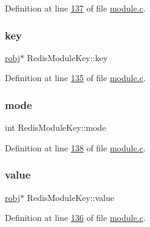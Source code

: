 Definition at line \hyperlink{module_8c_source_l00137}{137} of file \hyperlink{module_8c_source}{module.\+c}.

\mbox{\label{structRedisModuleKey_acf043c49b8fc45b97cb5e66aaddefba7}} 
\subsubsection{\texorpdfstring{key}{key}}
{\footnotesize\ttfamily \hyperlink{structredisObject}{robj}$\ast$ Redis\+Module\+Key\+::key}



Definition at line \hyperlink{module_8c_source_l00135}{135} of file \hyperlink{module_8c_source}{module.\+c}.

\mbox{\label{structRedisModuleKey_a085345181b4c4bf7ad3864bc2abd13bd}} 
\subsubsection{\texorpdfstring{mode}{mode}}
{\footnotesize\ttfamily int Redis\+Module\+Key\+::mode}



Definition at line \hyperlink{module_8c_source_l00138}{138} of file \hyperlink{module_8c_source}{module.\+c}.

\mbox{\label{structRedisModuleKey_a8168a2c5770215afebbb7ee8a6691df5}} 
\subsubsection{\texorpdfstring{value}{value}}
{\footnotesize\ttfamily \hyperlink{structredisObject}{robj}$\ast$ Redis\+Module\+Key\+::value}



Definition at line \hyperlink{module_8c_source_l00136}{136} of file \hyperlink{module_8c_source}{module.\+c}.

\mbox{\label{structRedisModuleKey_a6f2b1b3ad7bb57e059df69541bfefacc}} 
